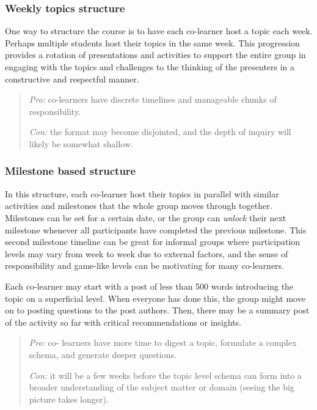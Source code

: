 \subsubsection{Weekly topics structure}\label{weekly-topics-structure}

One way to structure the course is to have each co-learner host a topic
each week. Perhaps multiple students host their topics in the same week.
This progression provides a rotation of presentations and activities to
support the entire group in engaging with the topics and challenges to
the thinking of the presenters in a constructive and respectful manner.

\begin{quote}
\emph{Pro:} co-learners have discrete timelines and manageable chunks of
responsibility.

\emph{Con:} the format may become disjointed, and the depth of inquiry
will likely be somewhat shallow.
\end{quote}

\subsubsection{Milestone based
structure}\label{milestone-based-structure}

In this structure, each co-learner host their topics in parallel with
similar activities and milestones that the whole group moves through
together. Milestones can be set for a certain date, or the group can
\emph{unlock} their next milestone whenever all participants have
completed the previous milestone. This second milestone timeline can be
great for informal groups where participation levels may vary from week
to week due to external factors, and the sense of responsibility and
game-like levels can be motivating for many co-learners.

Each co-learner may start with a post of less than 500 words introducing
the topic on a superficial level. When everyone has done this, the group
might move on to posting questions to the post authors. Then, there may
be a summary post of the activity so far with critical recommendations
or insights.

\begin{quote}
\emph{Pro:} co- learners have more time to digest a topic, formulate a
complex schema, and generate deeper questions.

\emph{Con:} it will be a few weeks before the topic level schema can
form into a broader understanding of the subject matter or domain
(seeing the big picture takes longer).
\end{quote}

